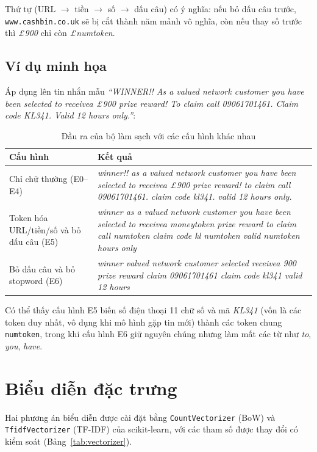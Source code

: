 Thứ tự (URL $\to$ tiền $\to$ số $\to$ dấu câu) có ý nghĩa: nếu bỏ dấu câu trước, \texttt{www.cashbin.co.uk} sẽ bị cắt thành năm mảnh vô nghĩa, còn nếu thay số trước thì \textit{£900} chỉ còn \textit{£numtoken}.

\subsection{Ví dụ minh họa}

Áp dụng lên tin nhắn mẫu \textit{``WINNER!! As a valued network customer you have been selected to receivea £900 prize reward! To claim call 09061701461. Claim code KL341. Valid 12 hours only.''}:

\begin{table}[H]
\centering
\caption{Đầu ra của bộ làm sạch với các cấu hình khác nhau}
\label{tab:vi-du-lam-sach}
\begin{tabular}{|p{3.4cm}|p{10.8cm}|}
\hline
\textbf{Cấu hình} & \textbf{Kết quả} \\
\hline
Chỉ chữ thường (E0--E4) & \textit{winner!! as a valued network customer you have been selected to receivea £900 prize reward! to claim call 09061701461. claim code kl341. valid 12 hours only.} \\
\hline
Token hóa URL/tiền/số và bỏ dấu câu (E5) & \textit{winner as a valued network customer you have been selected to receivea moneytoken prize reward to claim call numtoken claim code kl numtoken valid numtoken hours only} \\
\hline
Bỏ dấu câu và bỏ stopword (E6) & \textit{winner valued network customer selected receivea 900 prize reward claim 09061701461 claim code kl341 valid 12 hours} \\
\hline
\end{tabular}
\end{table}

Có thể thấy cấu hình E5 biến số điện thoại 11 chữ số và mã \textit{KL341} (vốn là các token duy nhất, vô dụng khi mô hình gặp tin mới) thành các token chung \texttt{numtoken}, trong khi cấu hình E6 giữ nguyên chúng nhưng làm mất các từ như \textit{to}, \textit{you}, \textit{have}.

\section{Biểu diễn đặc trưng}

Hai phương án biểu diễn được cài đặt bằng \texttt{CountVectorizer} (BoW) và \texttt{TfidfVectorizer} (TF-IDF) của scikit-learn, với các tham số được thay đổi có kiểm soát (Bảng~\ref{tab:vectorizer}).

